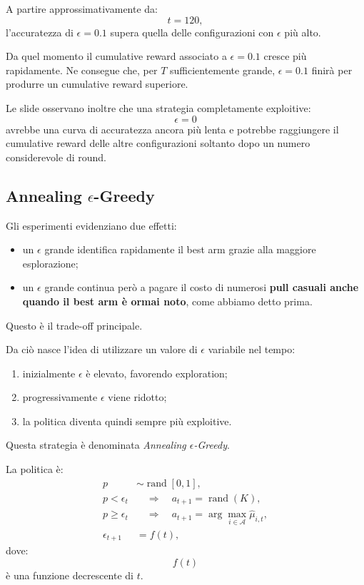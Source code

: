 A partire approssimativamente da:
\[
t=120,
\]
l'accuratezza di $\epsilon=0.1$ supera quella delle configurazioni con $\epsilon$ più alto.

Da quel momento il cumulative reward associato a $\epsilon=0.1$ cresce più rapidamente. Ne consegue che, per $T$ sufficientemente grande, $\epsilon=0.1$ finirà per produrre un cumulative reward superiore.

Le slide osservano inoltre che una strategia completamente exploitive:
\[
\epsilon=0
\]
avrebbe una curva di accuratezza ancora più lenta e potrebbe raggiungere il cumulative reward delle altre configurazioni soltanto dopo un numero considerevole di round.

\subsection{Annealing $\epsilon$-Greedy}

Gli esperimenti evidenziano due effetti:
\begin{itemize}
    \item un $\epsilon$ grande identifica rapidamente il best arm grazie alla maggiore esplorazione;
    \item un $\epsilon$ grande continua però a pagare il costo di numerosi \textbf{pull casuali anche quando il best arm è ormai noto}, come abbiamo detto prima.
\end{itemize}
Questo è il trade-off principale.


Da ciò nasce l'idea di utilizzare un valore di $\epsilon$ variabile nel tempo:
\begin{enumerate}
    \item inizialmente $\epsilon$ è elevato, favorendo exploration;
    \item progressivamente $\epsilon$ viene ridotto;
    \item la politica diventa quindi sempre più exploitive.
\end{enumerate}

Questa strategia è denominata \emph{Annealing $\epsilon$-Greedy}.

La politica è:
\begin{align*}
p &\sim \operatorname{rand}[0,1],\\
p<\epsilon_t
&\quad\Longrightarrow\quad
a_{t+1}=\operatorname{rand}(K),\\
p\geq\epsilon_t
&\quad\Longrightarrow\quad
a_{t+1}
=
\arg\max_{i\in\mathcal{A}}\widehat{\mu}_{i,t},\\
\epsilon_{t+1}&=f(t),
\end{align*}
dove:
\[
f(t)
\]
è una funzione decrescente di $t$.

